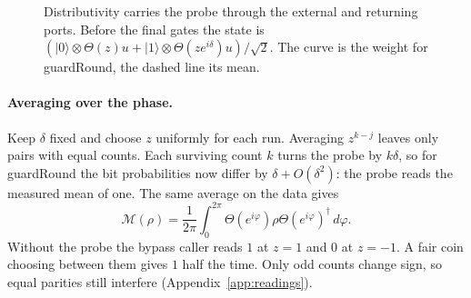 \documentclass[acmsmall,screen,review,anonymous,nonacm]{acmart}
\newcommand{\storyinlineface}{\small\ttfamily}
\newcommand{\code}[1]{\textnormal{\storyinlineface #1}}
\newcommand{\ket}[1]{\lvert #1\rangle}
\numberwithin{equation}{section}
\newcommand{\meas}{\mathcal M}
\begin{document}
\begin{figure}[!htbp]\centering
\begin{minipage}[c]{.54\linewidth}\centering
\phaseReadout{.78cm}
\end{minipage}\hfill\begin{minipage}[c]{.44\linewidth}\centering
{}
\end{minipage}
\caption{Distributivity carries the probe through the external and returning ports. Before the final gates the state is
$(\ket0\otimes\Theta(z)u+\ket1\otimes\Theta(ze^{i\delta})u)/\sqrt2$.
The curve is the weight for \code{guardRound}, the dashed line its mean.}
\label{fig:phase-probe}
\end{figure}

\paragraph{Averaging over the phase.}
Keep $\delta$ fixed and choose $z$ uniformly for each run. Averaging $z^{k-j}$ leaves only pairs with equal counts.
Each surviving count $k$ turns the probe by $k\delta$, so for \code{guardRound}
the bit probabilities now differ by $\delta+O(\delta^2)$: the probe reads the
measured mean of one. The same average on the data gives
\begin{equation}\label{eq:haar}
 \meas(\rho)=\frac1{2\pi}\int_0^{2\pi}\Theta(e^{i\varphi})\rho
       \Theta(e^{i\varphi})^\dagger\,d\varphi .
\end{equation}
Without the probe the bypass caller reads $1$ at $z=1$ and $0$ at $z=-1$. A fair coin
choosing between them gives $1$ half the time. Only odd counts change sign, so equal
parities still interfere (Appendix~\ref{app:readings}).
\end{document}
